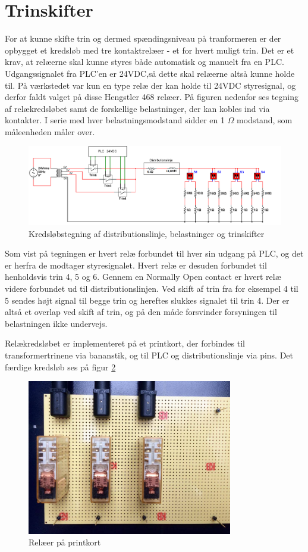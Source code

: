 

\section{Trinskifter}
\label{sec:Trinskifter}
For at kunne skifte trin og dermed spændingsniveau på tranformeren er der opbygget et kredsløb med tre kontaktrelæer - et for hvert muligt trin. Det er et krav, at relæerne skal kunne styres både automatisk og manuelt fra en PLC. Udgangssignalet fra PLC'en er 24VDC,så dette skal relæerne altså kunne holde til. På værkstedet var kun en type relæ der kan holde til 24VDC styresignal, og derfor faldt valget på disse Hengstler 468 relæer. På figuren nedenfor ses tegning af relækredsløbet samt de forskellige belastninger, der kan kobles ind via kontakter. I serie med hver belastningsmodstand sidder en 1 $\Omega$ modstand, som måleenheden måler over. 


\begin{figure}[H] 
	\centering
	\includegraphics[width=1\textwidth]{Figure/Trinskiftertegning2}
	\caption{Kredsløbstegning af distributionslinje, belastninger og trinskifter}
	\label{fig:Trinskiftertegning2}
\end{figure}

Som vist på tegningen er hvert relæ forbundet til hver sin udgang på PLC, og det er herfra de modtager styresignalet. Hvert relæ er desuden forbundet til henholdsvis trin 4, 5 og 6. Gennem en Normally Open contact er hvert relæ videre forbundet ud til distributionslinjen. Ved skift af trin fra for eksempel 4 til 5 sendes højt signal til begge trin og hereftes slukkes signalet til trin 4. Der er altså et overlap ved skift af trin, og på den måde forsvinder forsyningen til belastningen ikke undervejs. 

Relækredsløbet er implementeret på et printkort, der forbindes til transformertrinene via bananstik, og til PLC og distributionslinje via pins. Det færdige kredsløb ses på figur \ref{fig:Relaekredsloeb}

\begin{figure}[H] 
	\centering
	\includegraphics[width=0.8\textwidth]{Figure/Relaekredsl}
	\caption{Relæer på printkort}
	\label{fig:Relaekredsloeb}
\end{figure}

